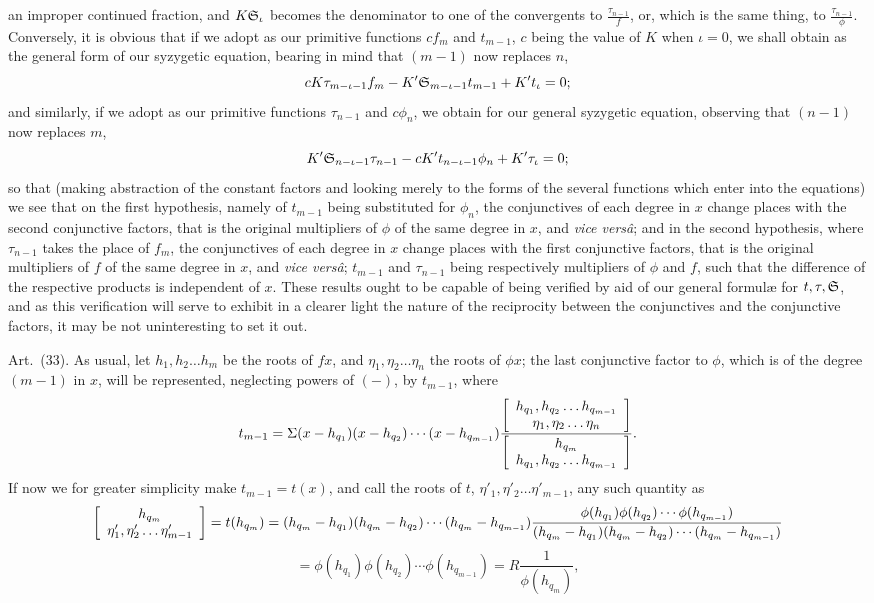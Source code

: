 \documentclass[11pt]{article}
\newcommand{\sourcepage}[1]{\marginpar{\scriptsize p.~#1}}
\newcommand{\art}[1]{\par\smallskip\noindent Art.~(#1).\quad}
\begin{document}
\sourcepage{481}
an improper continued fraction, and $K\mathfrak{S}_\iota$ becomes the denominator to one of the convergents to $\frac{\tau_{n-1}}{f}$, or, which is the same thing, to $\frac{\tau_{n-1}}{\phi}$. Conversely, it is obvious that if we adopt as our primitive functions $cf_m$ and $t_{m-1}$, $c$ being the value of $K$ when $\iota=0$, we shall obtain as the general form of our syzygetic equation, bearing in mind that $(m-1)$ now replaces $n$,
\[
cK\tau_{m-\iota-1}f_m-K'\mathfrak{S}_{m-\iota-1}t_{m-1}+K't_\iota=0;
\]
and similarly, if we adopt as our primitive functions $\tau_{n-1}$ and $c\phi_n$, we obtain for our general syzygetic equation, observing that $(n-1)$ now replaces $m$,
\[
K'\mathfrak{S}_{n-\iota-1}\tau_{n-1}-cK't_{n-\iota-1}\phi_n+K'\tau_\iota=0;
\]
so that (making abstraction of the constant factors and looking merely to the forms of the several functions which enter into the equations) we see that on the first hypothesis, namely of $t_{m-1}$ being substituted for $\phi_n$, the conjunctives of each degree in $x$ change places with the second conjunctive factors, that is the original multipliers of $\phi$ of the same degree in $x$, and \emph{vice versâ}; and in the second hypothesis, where $\tau_{n-1}$ takes the place of $f_m$, the conjunctives of each degree in $x$ change places with the first conjunctive factors, that is the original multipliers of $f$ of the same degree in $x$, and \emph{vice versâ}; $t_{m-1}$ and $\tau_{n-1}$ being respectively multipliers of $\phi$ and $f$, such that the difference of the respective products is independent of $x$. These results ought to be capable of being verified by aid of our general formulæ for $t,\tau,\mathfrak{S}$, and as this verification will serve to exhibit in a clearer light the nature of the reciprocity between the conjunctives and the conjunctive factors, it may be not uninteresting to set it out.

\art{33} As usual, let $h_1,h_2\ldots h_m$ be the roots of $fx$, and $\eta_1,\eta_2\ldots\eta_n$ the roots of $\phi x$; the last conjunctive factor to $\phi$, which is of the degree $(m-1)$ in $x$, will be represented, neglecting powers of $(-)$, by $t_{m-1}$, where
\[
t_{m-1}=\Sigma(x-h_{q_1})(x-h_{q_2})\cdots(x-h_{q_{m-1}})
\frac{\left[\begin{array}{c}h_{q_1},h_{q_2}\ldots h_{q_{m-1}}\\\eta_1,\eta_2\ldots\eta_n\end{array}\right]}
{\left[\begin{array}{c}h_{q_m}\\h_{q_1},h_{q_2}\ldots h_{q_{m-1}}\end{array}\right]}.
\]
If now we for greater simplicity make $t_{m-1}=t(x)$, and call the roots of $t$, $\eta'_1,\eta'_2\ldots\eta'_{m-1}$, any such quantity as
\[
\left[\begin{array}{c}h_{q_m}\\\eta'_1,\eta'_2\ldots\eta'_{m-1}\end{array}\right]=t(h_{q_m})
=(h_{q_m}-h_{q_1})(h_{q_m}-h_{q_2})\cdots(h_{q_m}-h_{q_{m-1}})
\frac{\phi(h_{q_1})\phi(h_{q_2})\cdots\phi(h_{q_{m-1}})}{(h_{q_m}-h_{q_1})(h_{q_m}-h_{q_2})\cdots(h_{q_m}-h_{q_{m-1}})}
\]
\[
=\phi(h_{q_1})\phi(h_{q_2})\cdots\phi(h_{q_{m-1}})
=R\frac1{\phi(h_{q_m})},
\]
\end{document}
